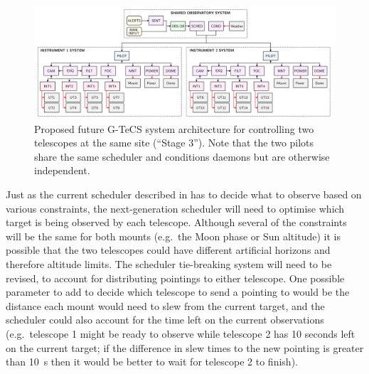 \begin{colsection}
\begin{figure}[t]
    \begin{center}
        \includegraphics[width=\linewidth]{images/flow2.pdf}
    \end{center}
    \caption[Future G-TeCS system architecture for two telescopes]{
        Proposed future G-TeCS system architecture for controlling two telescopes at the same site (``Stage 3''). Note that the two pilots share the same scheduler and conditions daemons but are otherwise independent.
    }\label{fig:flow2}
\end{figure}

Just as the current scheduler described in  has to decide what to observe based on various constraints, the next-generation scheduler will need to optimise which target is being observed by each telescope. Although several of the constraints will be the same for both mounts (e.g.\ the Moon phase or Sun altitude) it is possible that the two telescopes could have different artificial horizons and therefore altitude limits. The scheduler tie-breaking system will need to be revised, to account for distributing pointings to either telescope. One possible parameter to add to decide which telescope to send a pointing to would be the distance each mount would need to slew from the current target, and the scheduler could also account for the time left on the current observations (e.g.\ telescope 1 might be ready to observe while telescope 2 has 10 seconds left on the current target; if the difference in slew times to the new pointing is greater than \SI{10}{\second} then it would be better to wait for telescope 2 to finish).


\end{colsection}
